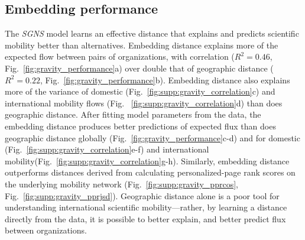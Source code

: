 \documentclass[12pt]{article} %
\def\SGNS{\textit{SGNS}}
\begin{document}
%
%
\subsection*{Embedding performance}

The \SGNS{} model learns an effective distance that explains and predicts scientific mobility better than alternatives. 
Embedding distance explains more of the expected flow between pairs of organizations, with correlation ($R^{2} = 0.46$, Fig.~\ref{fig:gravity_performance}a) over double that of geographic distance ($R^{2} = 0.22$, Fig.~\ref{fig:gravity_performance}b).
Embedding distance also explains more of the variance of domestic (Fig.~\ref{fig:supp:gravity_correlation}c) and international mobility flows (Fig. ~\ref{fig:supp:gravity_correlation}d) than does geographic distance. 
After fitting model parameters from the data, the embedding distance produces better predictions of expected flux than does geographic distance globally (Fig.~\ref{fig:gravity_performance}c-d) and for domestic (Fig.~\ref{fig:supp:gravity_correlation}e-f) and international mobility(Fig.~\ref{fig:supp:gravity_correlation}g-h).
Similarly, embedding distance outperforms distances derived from calculating personalized-page rank scores on the underlying mobility network (Fig.~\ref{fig:supp:gravity_pprcos}, Fig.~\ref{fig:supp:gravity_pprjsd}). 
Geographic distance alone is a poor tool for understanding international scientific mobility---rather, by learning a distance directly from the data, it is possible to better explain, and better predict flux between organizations. 
\end{document}
